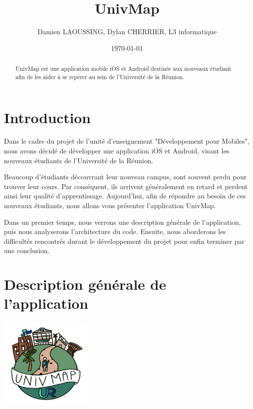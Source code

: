 \documentclass{article}
\title{UnivMap}
\author{Damien LAOUSSING, Dylan CHERRIER, L3 informatique}
\date{\today}
\begin{document}
\maketitle %


\begin{abstract}
  UnivMap est une application mobile iOS et Android destinée aux nouveaux
  étudiant afin de les aider à se repérer au sein de l'Université de la Réunion.
\end{abstract}


\section{Introduction}
\label{section:intro} %

Dans le cadre du projet de l'unité d'enseignement "Développement pour Mobiles", nous avons décidé de développer
une application iOS et Android, visant les nouveaux étudiants de l'Université de la Réunion.

Beaucoup d'étudiants découvrant leur nouveau campus, sont souvent perdu pour trouver leur cours. Par conséquent,
ils arrivent généralement en retard et perdent ainsi leur qualité d'apprentissage.
Aujourd'hui, afin de répondre au besoin de ces nouveaux étudiants, nous allons vous présenter l'application UnivMap.

Dans un premier temps, nous verrons une description générale de l'application, puis nous analyserons
l'architecture du code. Ensuite, nous aborderons les difficultés rencontrés durant le développement
du projet pour enfin terminer par une conclusion.

\section{Description générale de l'application}


\begin{center}
    \includegraphics[width=45mm, scale=0.5]{UnivMap-logo500x500.png}
\end{center}
\end{document}
